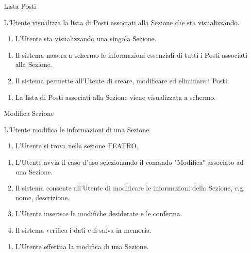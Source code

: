 {\ucTable	%
	{	%
		Lista Posti
		
	}{	%
		
	}{	%
		L'Utente visualizza la lista di Posti associati alla Sezione che sta visualizzando.
		
	}{	%
		\attori
	}{	%
		\begin{enumerate}
			\item L'Utente sta visualizzando una singola Sezione.
		\end{enumerate}
		
	}{	%
		\begin{enumerate}
            \item Il sistema mostra a schermo le informazioni essenziali di tutti i Posti associati alla Sezione.
            \item Il sistema permette all'Utente di creare, modificare ed eliminare i Posti.		
		\end{enumerate}
		
	}{	%
		\begin{enumerate}
			\item La lista di Posti associati alla Sezione viene visualizzata a schermo.
		\end{enumerate}
		
	}{	%
} }


{\ucExtTable	%
{	%
	Modifica Sezione
	
}{	%
	
}{	%
	L'Utente modifica le informazioni di una Sezione.
	
}{	%
	\attori
	
}{	%
	\begin{enumerate}
        \item L'Utente si trova nella sezione TEATRO.
    \end{enumerate}
	
}{	%
	\begin{enumerate}
        \item L'Utente avvia il caso d'uso selezionando il comando "Modifica" associato ad una Sezione.
        \item Il sistema consente all'Utente di modificare le informazioni della Sezione, e.g. nome, descrizione.
        \item L'Utente inserisce le modifiche desiderate e le conferma.
        \item Il sistema verifica i dati e li salva in memoria.
    \end{enumerate}
	
}{	%
	\begin{enumerate}
        \item L'Utente effettua la modifica di una Sezione.
    \end{enumerate}
	
} }


